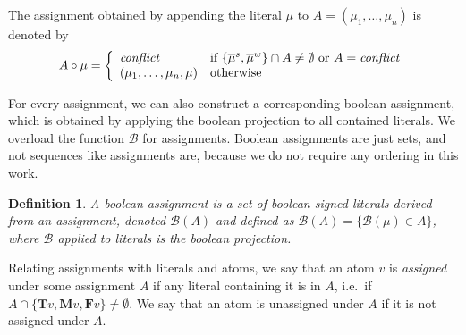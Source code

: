 \documentclass[final]{vutinfth} %
\newtheorem{definition}{Definition}[chapter]
\newcommand{\negstrong}[1]{\overline{#1}^s}
\newcommand{\negweak}[1]{\overline{#1}^w}
\newcommand{\bass}{\mathcal{B}}
\newcommand{\ass}{A}
\newcommand{\bT}{\mathbf{T}}
\newcommand{\bM}{\mathbf{M}}
\newcommand{\bF}{\mathbf{F}}
\newcommand{\sgl}{\mu}
\begin{document}
The assignment obtained by appending the literal $\sgl$ to $\ass = (\sgl_1, \ldots, \sgl_n)$ is denoted by $$\ass \circ \sgl = \left\{\begin{array}{ll}
        
        \emph{conflict} & \text{if } \{ \negstrong{\sgl}, \negweak{\sgl} \} \cap \ass \not = \emptyset \text{ or } \ass = \emph{conflict}\\
        (\sgl_1, \ldots, \sgl_{n}, \sgl) & \text{otherwise} \\
        \end{array}\right.$$



For every assignment, we can also construct a corresponding boolean assignment, which is obtained by applying the boolean projection to all contained literals. We overload the function $\bass$ for assignments. Boolean assignments are just sets, and not sequences like assignments are, because we do not require any ordering in this work.

\begin{definition}
A \emph{boolean assignment} is a set of boolean signed literals derived from an assignment, denoted $\bass(\ass)$ and defined as $\bass(\ass) = \{ \bass(\sgl) \in \ass \}$, where $\bass$ applied to literals is the boolean projection.
\end{definition}

Relating assignments with literals and atoms, we say that an atom $v$ is \emph{assigned} under some assignment $\ass$ if any literal containing it is in $\ass$, i.e.~if $\ass \cap \{\bT v, \bM v, \bF v \} \not = \emptyset$. We say that an atom is unassigned under $A$ if it is not assigned under $A$.

\end{document}
